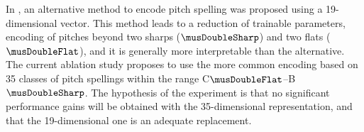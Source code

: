 
In , an alternative method
to encode pitch spelling was proposed using a 19-dimensional
vector. This method leads to a reduction of trainable
parameters, encoding of pitches beyond two sharps
($\musDoubleSharp$) and two flats ($\musDoubleFlat$), and it
is generally more interpretable than the alternative. The
current ablation study proposes to use the more common
encoding based on 35 classes of pitch spellings within the
range C$\musDoubleFlat$--B$\musDoubleSharp$. The hypothesis
of the experiment is that no significant performance gains
will be obtained with the 35-dimensional representation, and
that the 19-dimensional one is an adequate replacement.
